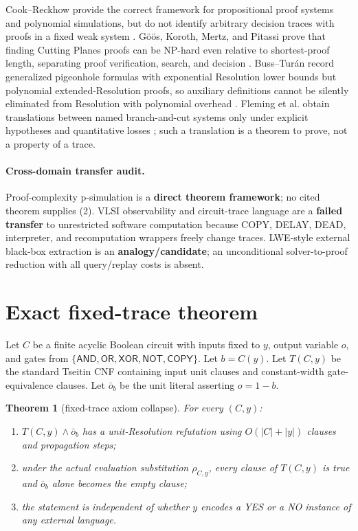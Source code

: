 \documentclass[11pt]{article}
\newtheorem{theorem}{Theorem}
\begin{document}
Cook--Reckhow provide the correct framework for propositional proof systems
and polynomial simulations, but do not identify arbitrary decision traces
with proofs in a fixed weak system \cite{cookreckhow,krajicek}.  G\"o\"os,
Koroth, Mertz, and Pitassi prove that finding Cutting Planes proofs can be
NP-hard even relative to shortest-proof length, separating proof verification,
search, and decision \cite{gkmp}.  Buss--Tur\'an record generalized
pigeonhole formulas with exponential Resolution lower bounds but polynomial
extended-Resolution proofs, so auxiliary definitions cannot be silently
eliminated from Resolution with polynomial overhead \cite{bussturan}.
Fleming et al. obtain translations between named branch-and-cut systems only
under explicit hypotheses and quantitative losses \cite{fleming}; such a
translation is a theorem to prove, not a property of a trace.

\paragraph{Cross-domain transfer audit.}
Proof-complexity p-simulation is a \textbf{direct theorem framework}; no cited
theorem supplies (2).  VLSI observability and circuit-trace language are a
\textbf{failed transfer} to unrestricted software computation because COPY,
DELAY, DEAD, interpreter, and recomputation wrappers freely change traces.
LWE-style external black-box extraction is an \textbf{analogy/candidate}; an
unconditional solver-to-proof reduction with all query/replay costs is absent.

\section{Exact fixed-trace theorem}
Let \(C\) be a finite acyclic Boolean circuit with inputs fixed to \(y\),
output variable \(o\), and gates from
\(\{\mathsf{AND},\mathsf{OR},\mathsf{XOR},\mathsf{NOT},\mathsf{COPY}\}\).
Let \(b=C(y)\).  Let \(T(C,y)\) be the standard Tseitin CNF containing input
unit clauses and constant-width gate-equivalence clauses.  Let \(\bar o_b\)
be the unit literal asserting \(o=1-b\).

\begin{theorem}[fixed-trace axiom collapse]
For every \((C,y)\):
\begin{enumerate}
\item \(T(C,y)\wedge\bar o_b\) has a unit-Resolution refutation using
  \(O(|C|+|y|)\) clauses and propagation steps;
\item under the actual evaluation substitution \(\rho_{C,y}\), every clause
  of \(T(C,y)\) is true and \(\bar o_b\) alone becomes the empty clause;
\item the statement is independent of whether \(y\) encodes a YES or a NO
  instance of any external language.
\end{enumerate}
\end{theorem}
\end{document}
